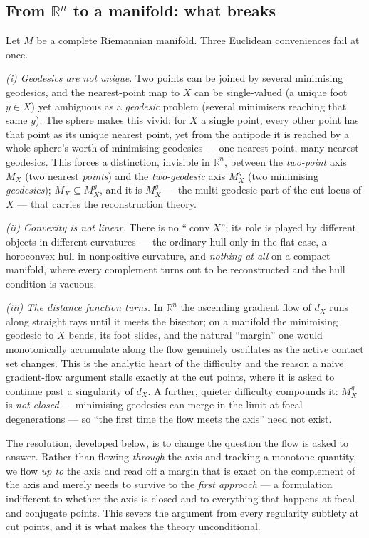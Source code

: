 \documentclass[11pt]{article}
\theoremstyle{remark}
\newcommand{\R}{\mathbb{R}}
\newcommand{\X}{X}
\newcommand{\Mx}{M_{\X}}
\newcommand{\Mg}{M^{g}_{\X}}
\newcommand{\dX}{d_{\X}}
\newcommand{\conv}{\operatorname{conv}}
\begin{document}
\subsection{From $\R^{n}$ to a manifold: what breaks}

Let $M$ be a complete Riemannian manifold. Three Euclidean
conveniences fail at once.

\emph{(i) Geodesics are not unique.} Two points can be joined by
several minimising geodesics, and the nearest-point map to $\X$ can be
single-valued (a unique foot $y\in\X$) yet ambiguous as a
\emph{geodesic} problem (several minimisers reaching that same $y$).
The sphere makes this vivid: for $\X$ a single point, every other
point has that point as its unique nearest point, yet from the
antipode it is reached by a whole sphere's worth of minimising
geodesics --- one nearest point, many nearest geodesics.
This forces a distinction, invisible in $\R^{n}$, between the
\emph{two-point} axis $\Mx$ (two nearest \emph{points}) and the
\emph{two-geodesic} axis $\Mg$ (two minimising \emph{geodesics});
$\Mx\subseteq\Mg$, and it is $\Mg$ --- the multi-geodesic part of the
cut locus of $\X$ --- that carries the reconstruction theory.

\emph{(ii) Convexity is not linear.} There is no ``$\conv\X$''; its
role is played by different objects in different curvatures --- the
ordinary hull only in the flat case, a horoconvex hull in
nonpositive curvature, and \emph{nothing at all} on a compact
manifold, where every complement turns out to be reconstructed and
the hull condition is vacuous.

\emph{(iii) The distance function turns.} In $\R^{n}$ the ascending
gradient flow of $\dX$ runs along straight rays until it meets the
bisector; on a manifold the minimising geodesic to $\X$ bends, its
foot slides, and the natural ``margin'' one would monotonically
accumulate along the flow genuinely oscillates as the active contact
set changes. This is the analytic
heart of the difficulty and the reason a naive gradient-flow argument
stalls exactly at the cut points, where it is asked to continue past
a singularity of $\dX$. A further, quieter difficulty compounds it:
$\Mg$ is \emph{not closed} --- minimising geodesics can merge in the
limit at focal degenerations --- so ``the first time the flow meets
the axis'' need not exist.

The resolution, developed below, is to change the question the flow
is asked to answer. Rather than flowing \emph{through} the axis and
tracking a monotone quantity, we flow \emph{up to} the axis and read
off a margin that is exact on the complement of the axis and merely
needs to survive to the \emph{first approach} --- a formulation
indifferent to whether the axis is closed and to everything that
happens at focal and conjugate points. This severs the argument from
every regularity subtlety at cut points, and it is what makes the
theory unconditional.
\end{document}
